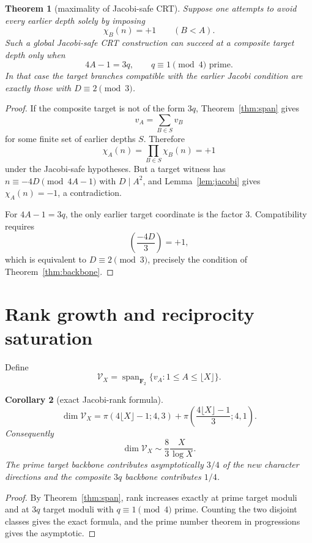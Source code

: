 \documentclass[11pt]{article}
\newtheorem{theorem}{Theorem}
\newtheorem{corollary}[theorem]{Corollary}
\theoremstyle{definition}
\begin{document}
\begin{theorem}[maximality of Jacobi-safe CRT]\label{thm:maximality}
Suppose one attempts to avoid every earlier depth solely by imposing
\[
\chi_B(n)=+1\qquad(B<A).
\]
Such a global Jacobi-safe CRT construction can succeed at a composite target depth only when
\[
\boxed{4A-1=3q,
\qquad q\equiv1\pmod4\text{ prime}.}
\]
In that case the target branches compatible with the earlier Jacobi condition are exactly those with $D\equiv2\pmod3$.
\end{theorem}

\begin{proof}
If the composite target is not of the form $3q$, Theorem~\ref{thm:span} gives
\[
v_A=\sum_{B\in S}v_B
\]
for some finite set of earlier depths $S$. Therefore
\[
\chi_A(n)=\prod_{B\in S}\chi_B(n)=+1
\]
under the Jacobi-safe hypotheses. But a target witness has $n\equiv-4D\pmod{4A-1}$ with $D\mid A^2$, and Lemma~\ref{lem:jacobi} gives $\chi_A(n)=-1$, a contradiction.

For $4A-1=3q$, the only earlier target coordinate is the factor $3$. Compatibility requires
\[
\left(\frac{-4D}{3}\right)=+1,
\]
which is equivalent to $D\equiv2\pmod3$, precisely the condition of Theorem~\ref{thm:backbone}.
\end{proof}

\section{Rank growth and reciprocity saturation}
Define
\[
\mathcal V_X=\operatorname{span}_{\mathbf F_2}\{v_A:1\le A\le\lfloor X\rfloor\}.
\]

\begin{corollary}[exact Jacobi-rank formula]\label{cor:rank}
\[
\boxed{
\dim\mathcal V_X
=
\pi(4\lfloor X\rfloor-1;4,3)
+
\pi\!\left(\frac{4\lfloor X\rfloor-1}{3};4,1\right).
}
\]
Consequently
\[
\boxed{\dim\mathcal V_X\sim\frac{8}{3}\frac{X}{\log X}.}
\]
The prime target backbone contributes asymptotically $3/4$ of the new character directions and the composite $3q$ backbone contributes $1/4$.
\end{corollary}

\begin{proof}
By Theorem~\ref{thm:span}, rank increases exactly at prime target moduli and at $3q$ target moduli with $q\equiv1\pmod4$ prime. Counting the two disjoint classes gives the exact formula, and the prime number theorem in progressions gives the asymptotic.
\end{proof}
\end{document}

